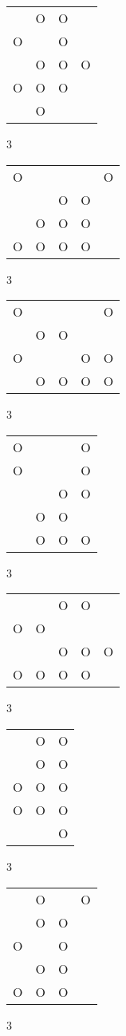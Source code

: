 \begin{tabular}{|m{0.2cm}m{0.2cm}m{0.2cm}m{0.2cm}|}\hline
 &O&O& \\
O& &O& \\
 &O&O&O\\
O&O&O& \\
 &O& & \\
\hline\end{tabular}3
\begin{tabular}{|m{0.2cm}m{0.2cm}m{0.2cm}m{0.2cm}m{0.2cm}|}\hline
O& & & &O\\
 & &O&O& \\
 &O&O&O& \\
O&O&O&O& \\
\hline\end{tabular}3
\begin{tabular}{|m{0.2cm}m{0.2cm}m{0.2cm}m{0.2cm}m{0.2cm}|}\hline
O& & & &O\\
 &O&O& & \\
O& & &O&O\\
 &O&O&O&O\\
\hline\end{tabular}3
\begin{tabular}{|m{0.2cm}m{0.2cm}m{0.2cm}m{0.2cm}|}\hline
O& & &O\\
O& & &O\\
 & &O&O\\
 &O&O& \\
 &O&O&O\\
\hline\end{tabular}3
\begin{tabular}{|m{0.2cm}m{0.2cm}m{0.2cm}m{0.2cm}m{0.2cm}|}\hline
 & &O&O& \\
O&O& & & \\
 & &O&O&O\\
O&O&O&O& \\
\hline\end{tabular}3
\begin{tabular}{|m{0.2cm}m{0.2cm}m{0.2cm}|}\hline
 &O&O\\
 &O&O\\
O&O&O\\
O&O&O\\
 & &O\\
\hline\end{tabular}3
\begin{tabular}{|m{0.2cm}m{0.2cm}m{0.2cm}m{0.2cm}|}\hline
 &O& &O\\
 &O&O& \\
O& &O& \\
 &O&O& \\
O&O&O& \\
\hline\end{tabular}3
